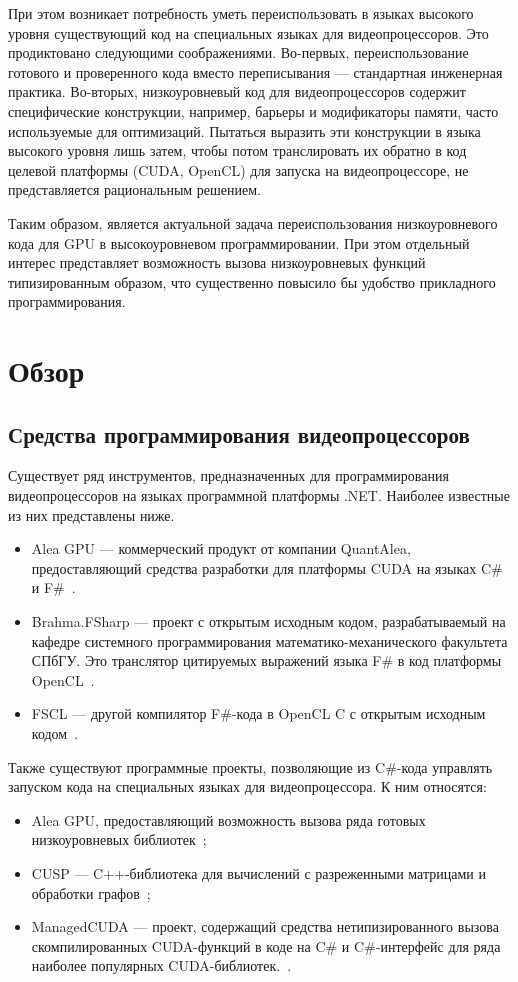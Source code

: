 При этом возникает потребность уметь переиспользовать в языках высокого уровня существующий код на специальных языках для видеопроцессоров. Это продиктовано следующими соображениями. Во-первых, переиспользование готового и проверенного кода вместо переписывания --- стандартная инженерная практика. Во-вторых, низкоуровневый код для видеопроцессоров содержит специфические конструкции, например, барьеры и модификаторы памяти, часто используемые для оптимизаций. Пытаться выразить эти конструкции в языка высокого уровня лишь затем, чтобы потом транслировать их обратно в код целевой платформы (CUDA, OpenCL) для запуска на видеопроцессоре, не представляется рациональным решением.

Таким образом, является актуальной задача переиспользования низкоуровневого кода для GPU в высокоуровневом программировании. При этом отдельный интерес представляет возможность вызова низкоуровневых функций типизированным образом, что существенно повысило бы удобство прикладного программирования.

\section{Обзор}

\subsection{Средства программирования видеопроцессоров}
Существует ряд инструментов, предназначенных для программирования видеопроцессоров на языках программной платформы .NET. Наиболее известные из них представлены ниже.
\begin{itemize}
    \item Alea GPU --- коммерческий продукт от компании QuantAlea, предоставляющий средства разработки для платформы CUDA на языках C\# и F\#~\cite{AleaGPU}.
    \item Brahma.FSharp --- проект с открытым исходным кодом, разрабатываемый на кафедре системного программирования математико-механического факультета СПбГУ. Это транслятор цитируемых выражений языка F\# в код платформы OpenCL~\cite{Brahma_FSharp}.
    \item FSCL --- другой компилятор F\#-кода в OpenCL C с открытым исходным кодом~\cite{FSCL}.
\end{itemize}

Также существуют программные проекты, позволяющие из C\#-кода управлять запуском кода на специальных языках для видеопроцессора. К ним относятся:
\begin{itemize}
    \item Alea GPU, предоставляющий возможность вызова ряда готовых низкоуровневых библиотек~\cite{AleaGPU};
    \item CUSP --- C++-библиотека для вычислений с разреженными матрицами и обработки графов~\cite{CUSP};
    \item ManagedCUDA --- проект, содержащий средства нетипизированного вызова скомпилированных CUDA-функций в коде на C\# и C\#-интерфейс для ряда наиболее популярных CUDA-библиотек.~\cite{ManagedCUDA}.
\end{itemize}

